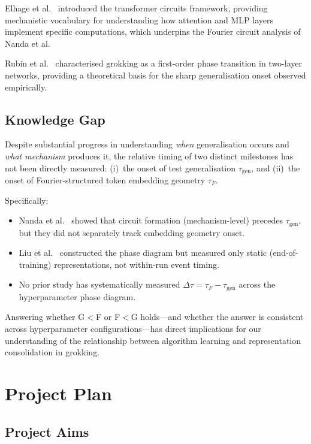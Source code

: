 \documentclass[12pt,openany,a4paper]{book}
\newcommand{\taug}{\tau_{\mathrm{gen}}}
\newcommand{\tauf}{\tau_{F}}
\newcommand{\Dtau}{\Delta\tau}
\begin{document}
Elhage et al.\ \cite{elhage2021mathematical} introduced the
transformer circuits framework, providing mechanistic vocabulary
for understanding how attention and MLP layers implement specific
computations, which underpins the Fourier circuit analysis of
Nanda et al.

Rubin et al.\ \cite{rubin2024grokking} characterised grokking as
a first-order phase transition in two-layer networks, providing a
theoretical basis for the sharp generalisation onset observed
empirically.

\section{Knowledge Gap}

Despite substantial progress in understanding \emph{when} generalisation
occurs and \emph{what mechanism} produces it, the relative timing of
two distinct milestones has not been directly measured:
(i)~the onset of test generalisation $\taug$, and
(ii)~the onset of Fourier-structured token embedding geometry $\tauf$.

Specifically:
\begin{itemize}
  \item Nanda et al.\ \cite{nanda2023progress} showed that circuit
    formation (mechanism-level) precedes $\taug$, but they did not
    separately track embedding geometry onset.
  \item Liu et al.\ \cite{liu2022towards} constructed the phase diagram
    but measured only static (end-of-training) representations, not
    within-run event timing.
  \item No prior study has systematically measured $\Dtau = \tauf - \taug$
    across the hyperparameter phase diagram.
\end{itemize}
Answering whether G$<$F or F$<$G holds---and whether the answer is
consistent across hyperparameter configurations---has direct implications
for our understanding of the relationship between algorithm learning
and representation consolidation in grokking.

\chapter{Project Plan}
\label{chap:plan}

\section{Project Aims}
\end{document}

